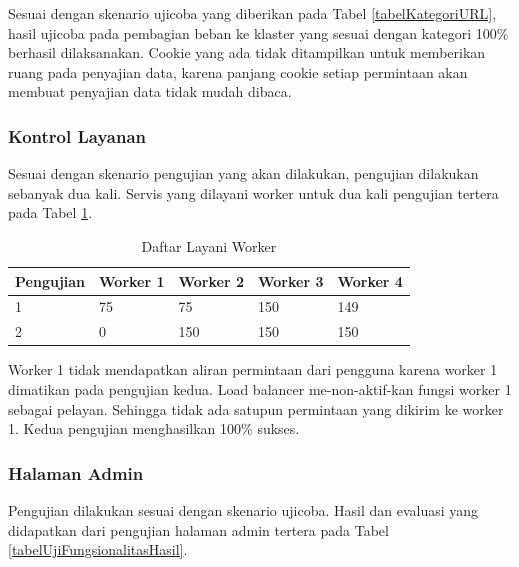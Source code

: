 \documentclass{ta-its}
\begin{document}
					Sesuai dengan skenario ujicoba yang diberikan pada Tabel \ref{tabelKategoriURL}, hasil ujicoba pada pembagian beban ke klaster yang sesuai dengan kategori 100\% berhasil dilaksanakan. Cookie yang ada tidak ditampilkan untuk memberikan ruang pada penyajian data, karena panjang cookie setiap permintaan akan membuat penyajian data tidak mudah dibaca.
									
				\subsubsection{Kontrol Layanan}
					Sesuai dengan skenario pengujian yang akan dilakukan, pengujian dilakukan sebanyak dua kali. Servis yang dilayani worker untuk dua kali pengujian tertera pada Tabel \ref{tabelKontrolLayanan}.
					
					\begin{longtable}{|p{0.15\textwidth}|p{}|p{}|p{}|p{}|} %
						
						\caption{Daftar Layani Worker} \label{tabelKontrolLayanan} \\
						\hline
						\textbf{Pengujian} & \textbf{Worker 1} & \textbf{Worker 2} & \textbf{Worker 3} & \textbf{Worker 4}\\ \hline
						
						\endhead
						\endfoot
						\endlastfoot
						
						1 & 75 & 75 & 150 & 149 \\ \hline
						2 & 0 & 150 & 150 & 150 \\ \hline
						
					\end{longtable}
					
					Worker 1 tidak mendapatkan aliran permintaan dari pengguna karena worker 1 dimatikan pada pengujian kedua. Load balancer me-non-aktif-kan fungsi worker 1 sebagai pelayan. Sehingga tidak ada satupun permintaan yang dikirim ke worker 1. Kedua pengujian menghasilkan 100\% sukses.
				
				\subsubsection{Halaman Admin}
					Pengujian dilakukan sesuai dengan skenario ujicoba. Hasil dan evaluasi yang didapatkan dari pengujian halaman admin tertera pada Tabel \ref{tabelUjiFungsionalitasHasil}.
					
\end{document}
